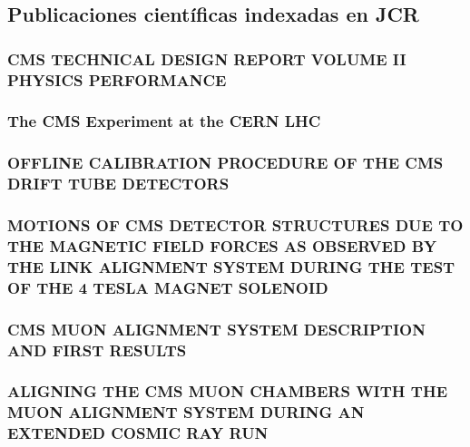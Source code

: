 \documentclass[a4paper, 11pt, twoside, openright]{report}
\begin{document}
\subsection{Publicaciones científicas indexadas en JCR}

\subsubsection{CMS TECHNICAL DESIGN REPORT VOLUME II PHYSICS PERFORMANCE}

\subsubsection{The CMS Experiment at the CERN LHC}

\subsubsection{OFFLINE CALIBRATION PROCEDURE OF THE CMS DRIFT TUBE DETECTORS}

\subsubsection{MOTIONS OF CMS DETECTOR STRUCTURES DUE TO THE MAGNETIC FIELD FORCES AS OBSERVED BY THE LINK ALIGNMENT SYSTEM DURING THE TEST OF THE 4 TESLA MAGNET SOLENOID}

\subsubsection{CMS MUON ALIGNMENT SYSTEM DESCRIPTION AND FIRST RESULTS}

\subsubsection{ALIGNING THE CMS MUON CHAMBERS WITH THE MUON ALIGNMENT SYSTEM DURING AN EXTENDED COSMIC RAY RUN}

\end{document}
